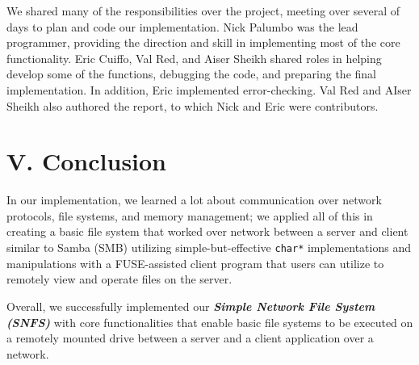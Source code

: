 \documentclass[10pt]{article}
\begin{document}
We shared many of the responsibilities over the project, meeting over several of days to plan 
and code our implementation. Nick Palumbo was the lead programmer, providing the direction and 
skill in implementing most of the core functionality. Eric Cuiffo, Val Red, and Aiser Sheikh 
shared roles in helping develop some of the functions, debugging the code, and preparing the 
final implementation. In addition, Eric implemented error-checking. Val Red and AIser Sheikh also 
authored the report, to which Nick and Eric were contributors. 

\section {V. Conclusion}

In our implementation, we learned a lot about communication over network protocols, file 
systems, and memory management; we applied all of this in creating a basic file system that 
worked over network between a server and client similar to Samba (SMB) utilizing simple-but-effective 
\texttt{char*} implementations and manipulations with a FUSE-assisted client program that users 
can utilize to remotely view and operate files on the server. 

Overall, we successfully implemented our \textbf{\textit{Simple Network File System (SNFS) }} 
with core functionalities that enable basic file systems to be executed on a remotely mounted 
drive between a server and a client application over a network.
\end{document}
